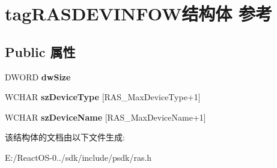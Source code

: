 \hypertarget{structtag_r_a_s_d_e_v_i_n_f_o_w}{}\section{tag\+R\+A\+S\+D\+E\+V\+I\+N\+F\+O\+W结构体 参考}
\label{structtag_r_a_s_d_e_v_i_n_f_o_w}
\subsection*{Public 属性}
\begin{DoxyCompactItemize}
\item 
\mbox{\label{structtag_r_a_s_d_e_v_i_n_f_o_w_afd83f8098166c3005a0827e5524d5769}} 
D\+W\+O\+RD {\bfseries dw\+Size}
\item 
\mbox{\label{structtag_r_a_s_d_e_v_i_n_f_o_w_ad7cf81c9bf6baf34d52eaa5fb52114a5}} 
W\+C\+H\+AR {\bfseries sz\+Device\+Type} \mbox{[}R\+A\+S\+\_\+\+Max\+Device\+Type+1\mbox{]}
\item 
\mbox{\label{structtag_r_a_s_d_e_v_i_n_f_o_w_ab6c342b1e2bb08ba5bb755bae4079214}} 
W\+C\+H\+AR {\bfseries sz\+Device\+Name} \mbox{[}R\+A\+S\+\_\+\+Max\+Device\+Name+1\mbox{]}
\end{DoxyCompactItemize}


该结构体的文档由以下文件生成\+:\begin{DoxyCompactItemize}
\item 
E\+:/\+React\+O\+S-\/0../sdk/include/psdk/ras.\+h\end{DoxyCompactItemize}
